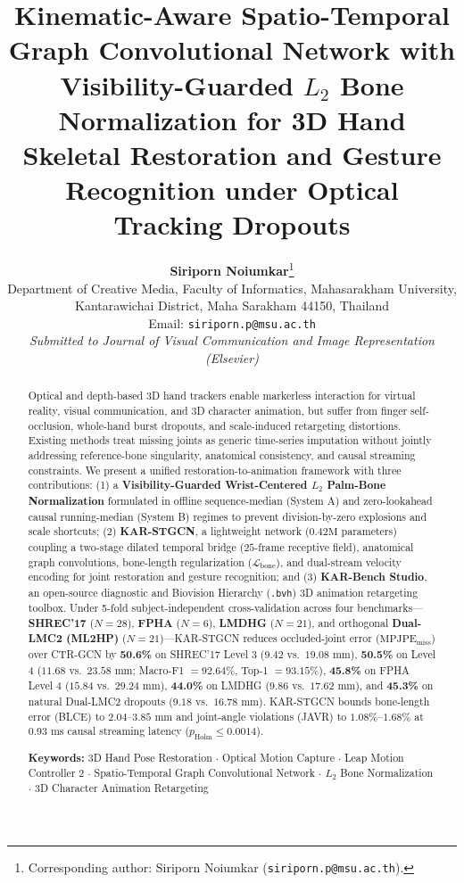 \documentclass[10pt,twocolumn]{article}
\title{\Large \textbf{Kinematic-Aware Spatio-Temporal Graph Convolutional Network with Visibility-Guarded $L_2$ Bone Normalization for 3D Hand Skeletal Restoration and Gesture Recognition under Optical Tracking Dropouts}}
\author{
\textbf{Siriporn Noiumkar}\thanks{Corresponding author: Siriporn Noiumkar (\texttt{siriporn.p@msu.ac.th}).} \\[3pt]
\small Department of Creative Media, Faculty of Informatics, Mahasarakham University, \\
\small Kantarawichai District, Maha Sarakham 44150, Thailand \\
\small Email: \texttt{siriporn.p@msu.ac.th} \\[3pt]
\footnotesize \textit{Submitted to Journal of Visual Communication and Image Representation (Elsevier)}
}
\date{}
\begin{document}
\maketitle

\begin{abstract}
\noindent Optical and depth-based 3D hand trackers enable markerless interaction for virtual reality, visual communication, and 3D character animation, but suffer from finger self-occlusion, whole-hand burst dropouts, and scale-induced retargeting distortions. Existing methods treat missing joints as generic time-series imputation without jointly addressing reference-bone singularity, anatomical consistency, and causal streaming constraints. We present a unified restoration-to-animation framework with three contributions: (1) a \textbf{Visibility-Guarded Wrist-Centered $L_2$ Palm-Bone Normalization} formulated in offline sequence-median (System A) and zero-lookahead causal running-median (System B) regimes to prevent division-by-zero explosions and scale shortcuts; (2) \textbf{KAR-STGCN}, a lightweight network ($0.42\text{M}$ parameters) coupling a two-stage dilated temporal bridge ($25$-frame receptive field), anatomical graph convolutions, bone-length regularization ($\mathcal{L}_{\text{bone}}$), and dual-stream velocity encoding for joint restoration and gesture recognition; and (3) \textbf{KAR-Bench Studio}, an open-source diagnostic and Biovision Hierarchy (\texttt{.bvh}) 3D animation retargeting toolbox. Under 5-fold subject-independent cross-validation across four benchmarks---\textbf{SHREC'17} ($N=28$), \textbf{FPHA} ($N=6$), \textbf{LMDHG} ($N=21$), and orthogonal \textbf{Dual-LMC2 (ML2HP)} ($N=21$)---KAR-STGCN reduces occluded-joint error ($\text{MPJPE}_{\text{miss}}$) over CTR-GCN by \textbf{50.6\%} on SHREC'17 Level 3 ($9.42$ vs.\ $19.08\text{ mm}$), \textbf{50.5\%} on Level 4 ($11.68$ vs.\ $23.58\text{ mm}$; Macro-F1 $= 92.64\%$, Top-1 $= 93.15\%$), \textbf{45.8\%} on FPHA Level 4 ($15.84$ vs.\ $29.24\text{ mm}$), \textbf{44.0\%} on LMDHG ($9.86$ vs.\ $17.62\text{ mm}$), and \textbf{45.3\%} on natural Dual-LMC2 dropouts ($9.18$ vs.\ $16.78\text{ mm}$). KAR-STGCN bounds bone-length error (BLCE) to $2.04\text{--}3.85\text{ mm}$ and joint-angle violations (JAVR) to $1.08\%\text{--}1.68\%$ at \textbf{$0.93\text{ ms}$} causal streaming latency ($p_{\text{Holm}} \le 0.0014$).

\vspace{3pt}
\noindent \textbf{Keywords:} 3D Hand Pose Restoration $\cdot$ Optical Motion Capture $\cdot$ Leap Motion Controller 2 $\cdot$ Spatio-Temporal Graph Convolutional Network $\cdot$ $L_2$ Bone Normalization $\cdot$ 3D Character Animation Retargeting
\end{abstract}
\end{document}
